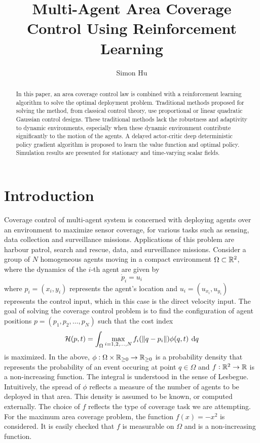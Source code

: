 \documentclass[10pt,conference]{IEEEtran}
\title{\bf\Large{Multi-Agent Area Coverage Control Using Reinforcement Learning}}
\author{Simon Hu}
\begin{document}
	
\maketitle
\thispagestyle{empty}
\pagestyle{empty}
\begin{abstract}
	In this paper, an area coverage control law is combined with a reinforcement learning algorithm to solve the optimal deployment problem. Traditional methods proposed for solving the method, from classical control theory, use proportional or linear quadratic Gaussian control designs. These traditional methods lack the robustness and adaptivity to dynamic environments, especially when these dynamic environment contribute significantly to the motion of the agents. A delayed actor-critic deep deterministic policy gradient algorithm is proposed to learn the value function and optimal policy. Simulation results are presented for stationary and time-varying scalar fields.
\end{abstract}
\section{Introduction}
	Coverage control of multi-agent system is concerned with deploying agents over an environment to maximize sensor coverage, for various tasks such as sensing, data collection and surveillance missions. Applications of this problem are harbour patrol, search and rescue, data, and surveillance missions. Consider a group of $N$ homogeneous agents moving in a compact environment $\Omega \subset \mathbb{R}^2$, where the dynamics of the $i$-th agent are given by 
	\begin{equation}
		\label{dynamics}
		\displaystyle \dot{p}_i = u_i
	\end{equation}
	where $p_i = (x_i, y_i)$ represents the agent's location and $u_i = (u_{x_i}, u_{y_i})$ represents the control input, which in this case is the direct velocity input. The goal of solving the coverage control problem is to find the configuration of agent positions $p = (p_1, p_2, \dots, p_N)$ such that the cost index 
	\begin{equation}
		\label{cost index}
		\displaystyle \mathcal{H}(p,t) = \int_{\Omega}{\max\limits_{i=1,2,\dots,N}{f_i(\,\norm{q - p_i})}\phi(q,t) \: \dif q}
	\end{equation}
	is maximized. In the above, $\phi : \Omega \times \mathbb{R}_{\geq 0} \to \mathbb{R}_{\geq 0}$ is a probability density that represents the probability of an event occuring at point $q \in \Omega$ and $f: \mathbb{R}^2 \to \mathbb{R}$ is a non-increasing function. The integral is understood in the sense of Lesbegue. Intuitively, the spread of $\phi$ reflects a measure of the number of agents to be deployed in that area. This density is assumed to be known, or computed externally. The choice of $f$ reflects the type of coverage task we are attempting. For the maximum area coverage problem, the function $f(x) = -x^2$ is considered. It is easily checked that $f$ is measurable on $\Omega$ and is a non-increasing function. 
\end{document}
